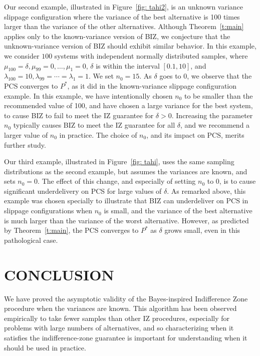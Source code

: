 \documentclass{wscpaperproc}
\theoremstyle{wsc}
\begin{document}
Our second example, illustrated in Figure~\ref{fig: tahi2}, is an unknown variance slippage configuration where the variance of the best alternative is 100 times larger than the variance of the other alternatives. Although Theorem~\ref{t:main} applies only to the known-variance version of BIZ, we conjecture that the unknown-variance version of BIZ should exhibit similar behavior.
In this example, we consider $100$ systems with independent normally distributed samples, where $\mu_{100}=\delta,\mu_{99}=0,\dots,\mu_{1}=0$, $\delta$ is within the interval $[0.1,10]$, and $\lambda_{100}=10,\lambda_{99}=\cdots=\lambda_{1}=1$. We set $n_{0}=15$.
As $\delta$ goes to $0$, we observe that the PCS converges to $P^*$, as it did in the known-variance slippage configuration example.
In this example, we have intentionally chosen $n_0$ to be smaller than the recommended value of 100, and have chosen a large variance for the best system, to cause BIZ to fail to meet the IZ guarantee for $\delta>0$.
Increasing the parameter $n_0$ typically causes BIZ to meet the IZ guarantee for all $\delta$, and we recommend a larger value of $n_0$ in practice.  The choice of $n_0$, and its impact on PCS, merits further study.

Our third example, illustrated in Figure~\ref{fig: tahi}, uses the same sampling distributions as the second example, but assumes the variances are known, and sets $n_0=0$.
The effect of this change, and especially of setting $n_0$ to $0$, is to cause significant underdelivery on PCS for large values of $\delta$.  
As remarked above, this example was chosen specially to illustrate that BIZ can underdeliver on PCS in slippage configurations when $n_0$ is small, and the variance of the best alternative is much larger than the variance of the worst alternative.  However, as predicted by Theorem~\ref{t:main}, the PCS converges to $P^*$ as $\delta$ grows small, even in this pathological case. 




\section{CONCLUSION}
\label{conclusion}

We have proved the asymptotic validity of the Bayes-inspired Indifference Zone
procedure \cite{Frazier:BIZ} when the variances are known.
This algorithm has been observed empirically to take fewer samples than other IZ procedures, especially for
problems with large numbers of alternatives, and so characterizing when it
satisfies the indifference-zone guarantee is important for understanding when
it should be used in practice.
\end{document}

